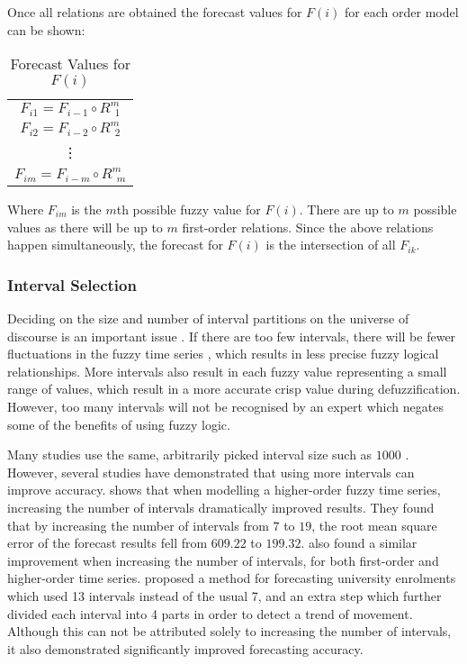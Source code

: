 \documentclass{article}
\theoremstyle{definition}
\begin{document}
Once all relations are obtained the forecast values for $F(i)$ for each order model can be shown:

\begin{table}[H]
	\center
	\begin{tabular}{ c }
  	$F_{i1} = F_{i-1} \circ R^{m}_{\ \ 1}$ \\
  	$F_{i2} = F_{i-2} \circ R^{m}_{\ \ 2}$ \\
  	\vdots \\
  	$F_{im} = F_{i-m} \circ R^{m}_{\ \ m}$ \\
	\end{tabular}
	\caption{Forecast Values for $F(i)$}
\end{table}

Where $F_{im}$ is the $m$th possible fuzzy value for $F(i)$. There are up to $m$ possible values as there will be up to $m$ first-order relations. Since the above relations happen simultaneously, the forecast for $F(i)$ is the intersection of all $F_{ik}$.

\subsubsection{Interval Selection}

Deciding on the size and number of interval partitions on the universe of discourse is an important issue \citep{Huarng2001effective,  huarng2006ratio}. If there are too few intervals, there will be fewer fluctuations in the fuzzy time series \citep{Huarng2001effective}, which results in less precise fuzzy logical relationships. More intervals also result in each fuzzy value representing a small range of values, which result in a more accurate crisp value during defuzzification. However, too many intervals will not be recognised by an expert which negates some of the benefits of using fuzzy logic.

Many studies use the same, arbitrarily picked interval size such as $1000$ \citep{song1993forecasting, song1994forecasting, chen1996forecasting, tsai2000forecasting, chen2004new}. However, several studies have demonstrated that using more intervals can improve accuracy. \citep{tsai2000forecasting} shows that when modelling a higher-order fuzzy time series, increasing the number of intervals dramatically improved results. They found that by increasing the number of intervals from $7$ to $19$, the root mean square error of the forecast results fell from $609.22$ to $199.32$. \cite{tsai1999study} also found a similar improvement when increasing the number of intervals, for both first-order and higher-order time series. \cite{chen2004new} proposed a method for forecasting university enrolments which used 13 intervals instead of the usual 7, and an extra step which further divided each interval into 4 parts in order to detect a trend of movement. Although this can not be attributed solely to increasing the number of intervals, it also demonstrated significantly improved forecasting accuracy. 	
\end{document}
